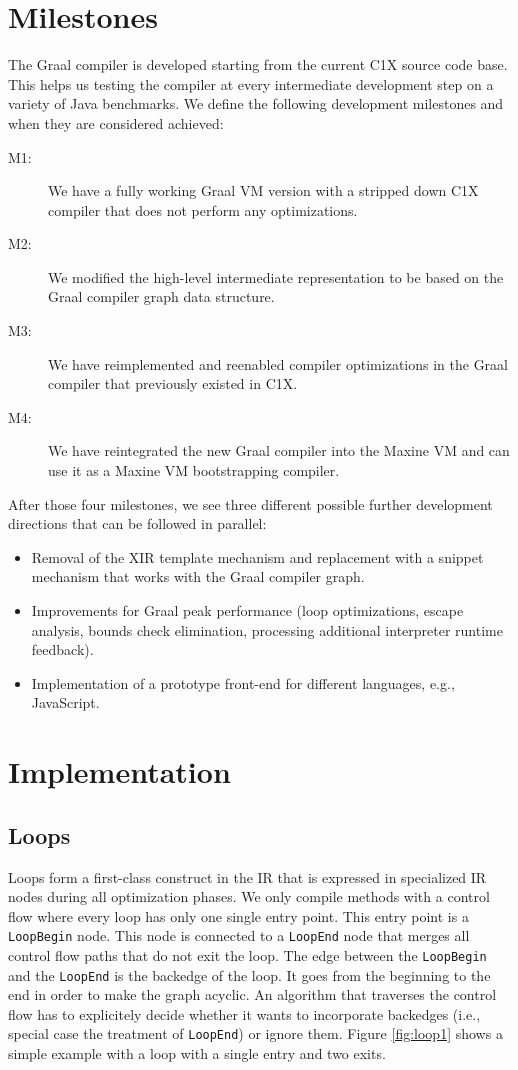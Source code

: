 \documentclass[twocolumn]{svjour3}
\newcommand\nodename[1]{\texttt{#1}}
\begin{document}
\section{Milestones}
The Graal compiler is developed starting from the current C1X source code base.
This helps us testing the compiler at every intermediate development step on a variety of Java benchmarks.
We define the following development milestones and when they are considered achieved:
\begin{description}
\item[M1:] We have a fully working Graal VM version with a stripped down C1X compiler that does not perform any optimizations.
\item[M2:] We modified the high-level intermediate representation to be based on the Graal compiler graph data structure.
\item[M3:] We have reimplemented and reenabled compiler optimizations in the Graal compiler that previously existed in C1X.
\item[M4:] We have reintegrated the new Graal compiler into the Maxine VM and can use it as a Maxine VM bootstrapping compiler.
\end{description}

After those four milestones, we see three different possible further development directions that can be followed in parallel:
\begin{itemize}
  \item Removal of the XIR template mechanism and replacement with a snippet mechanism that works with the Graal compiler graph.
  \item Improvements for Graal peak performance (loop optimizations, escape analysis, bounds check elimination, processing additional interpreter runtime feedback).
  \item Implementation of a prototype front-end for different languages, e.g., JavaScript.
\end{itemize}

\section{Implementation}

\subsection{Loops}
\label{sec:loops}
Loops form a first-class construct in the IR that is expressed in specialized IR nodes during all optimization phases.
We only compile methods with a control flow where every loop has only one single entry point.
This entry point is a \nodename{LoopBegin} node.
This node is connected to a \nodename{LoopEnd} node that merges all control flow paths that do not exit the loop.
The edge between the \nodename{LoopBegin} and the \nodename{LoopEnd} is the backedge of the loop.
It goes from the beginning to the end in order to make the graph acyclic.
An algorithm that traverses the control flow has to explicitely decide whether it wants to incorporate backedges (i.e., special case the treatment of \nodename{LoopEnd}) or ignore them.
Figure \ref{fig:loop1} shows a simple example with a loop with a single entry and two exits.
\end{document}
